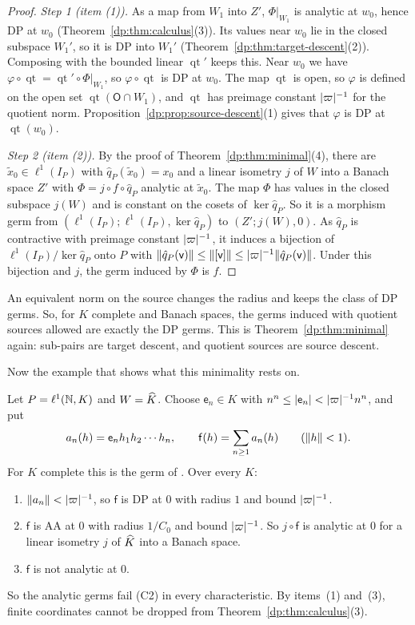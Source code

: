 \begin{proof}
\emph{Step 1 (item (1)).} As a map from $W_1$ into $Z'$, $\Phi|_{W_1}$ is analytic at $w_0$, hence DP at $w_0$ (Theorem~\ref{dp:thm:calculus}(3)). Its values near $w_0$ lie in the closed subspace $W_1'$, so it is DP into $W_1'$ (Theorem~\ref{dp:thm:target-descent}(2)). Composing with the bounded linear $\operatorname{qt}'$ keeps this. Near $w_0$ we have $\varphi\circ\operatorname{qt}=\operatorname{qt}'\circ\Phi|_{W_1}$, so $\varphi\circ\operatorname{qt}$ is DP at $w_0$. The map $\operatorname{qt}$ is open, so $\varphi$ is defined on the open set $\operatorname{qt}(\mathsf O\cap W_1)$, and $\operatorname{qt}$ has preimage constant $\lvert \varpi\rvert^{-1}$ for the quotient norm. Proposition~\ref{dp:prop:source-descent}(1) gives that $\varphi$ is DP at $\operatorname{qt}(w_0)$.

\emph{Step 2 (item (2)).} By the proof of Theorem~\ref{dp:thm:minimal}(4), there are $\tilde x_0\in\ell^1(I_P)$ with $\hat q_P(\tilde x_0)=x_0$ and a linear isometry $j$ of $W$ into a Banach space $Z'$ with $\Phi=j\circ f\circ\hat q_P$ analytic at $\tilde x_0$. The map $\Phi$ has values in the closed subspace $j(W)$ and is constant on the cosets of $\ker\hat q_P$. So it is a morphism germ from $(\ell^1(I_P);\ell^1(I_P),\ker\hat q_P)$ to $(Z';j(W),0)$. As $\hat q_P$ is contractive with preimage constant $\lvert \varpi\rvert^{-1}$, it induces a bijection of $\ell^1(I_P)/\ker\hat q_P$ onto $P$ with $\lVert \hat q_P(\mathsf v)\rVert\le\lVert [\mathsf v]\rVert\le\lvert \varpi\rvert^{-1}\lVert \hat q_P(\mathsf v)\rVert$. Under this bijection and $j$, the germ induced by $\Phi$ is $f$.
\end{proof}

An equivalent norm on the source changes the radius and keeps the class of DP germs. So, for $K$ complete and Banach spaces, the germs induced with quotient sources allowed are exactly the DP germs. This is Theorem~\ref{dp:thm:minimal} again: sub-pairs are target descent, and quotient sources are source descent.

Now the example that shows what this minimality rests on.

\begin{example}\label{dp:ex:l1}
Let $P=\ell^1(\mathbb N,K)$ and $W=\widehat K$. Choose $\mathsf e_n\in K$ with $n^n\le\lvert \mathsf e_n\rvert<\lvert \varpi\rvert^{-1}n^n$, and put
\[
 a_n(h)=\mathsf e_nh_1h_2\cdots h_n,\qquad\mathsf f(h)=\sum_{n\ge1}a_n(h)\qquad(\lVert h\rVert<1).
\]
For $K$ complete this is the germ of \cite[Theorem~14.33(1)]{I}. Over every $K$:
\begin{enumerate}
\item $\lVert a_n\rVert<\lvert \varpi\rvert^{-1}$, so $\mathsf f$ is DP at $0$ with radius $1$ and bound $\lvert \varpi\rvert^{-1}$.
\item $\mathsf f$ is AA at $0$ with radius $1/C_0$ and bound $\lvert \varpi\rvert^{-1}$. So $j\circ\mathsf f$ is analytic at $0$ for a linear isometry $j$ of $\widehat K$ into a Banach space.
\item $\mathsf f$ is not analytic at $0$.
\end{enumerate}
So the analytic germs fail (C2) in every characteristic. By items~(1) and~(3), finite coordinates cannot be dropped from Theorem~\ref{dp:thm:calculus}(3).
\end{example}

